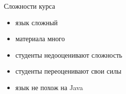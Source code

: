\documentclass[unknownkeysallowed,xcolor=table]{beamer}
\begin{document}
\begin{frame}{Сложности курса}
  \begin{itemize}
    \item язык сложный \vspace{1em}
    \item материала много \vspace{1em}
    \item студенты недооценивают сложность \vspace{1em}
    \item студенты переоценивают свои силы \vspace{1em}
    \item язык не похож на Java
  \end{itemize}
\end{frame}
\end{document}
